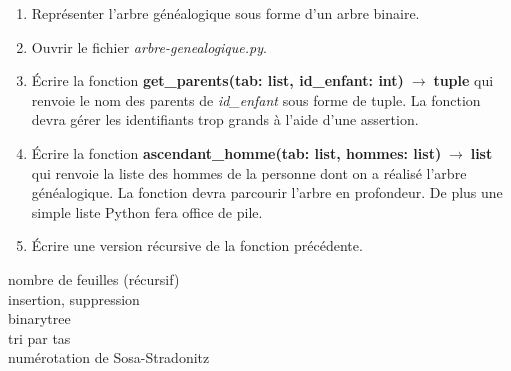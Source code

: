 \documentclass[a4paper,11pt]{article}
\begin{document}
\begin{Form}
\begin{exo}
\begin{center}
\label{manu}
\end{center}
\begin{enumerate}[resume]
\item Représenter l'arbre généalogique sous forme d'un arbre binaire.
\item Ouvrir le fichier \emph{arbre-genealogique.py}.
\item Écrire la fonction \textbf{get\_parents(tab: list, id\_enfant: int)$\;\rightarrow\;$tuple} qui renvoie le nom des parents de \emph{id\_enfant} sous forme de tuple. La fonction devra gérer les identifiants trop grands à l'aide d'une assertion.
\item Écrire la fonction \textbf{ascendant\_homme(tab: list, hommes: list)$\;\rightarrow\;$list} qui renvoie la liste des hommes de la personne dont on a réalisé l'arbre généalogique. La fonction devra parcourir l'arbre en profondeur. De plus une simple liste Python fera office de pile.
\item Écrire une version récursive de la fonction précédente.
\end{enumerate}
\end{exo}
nombre de feuilles (récursif)\\
insertion, suppression\\
binarytree\\
tri par tas\\
numérotation de Sosa-Stradonitz
\end{Form}
\end{document}
